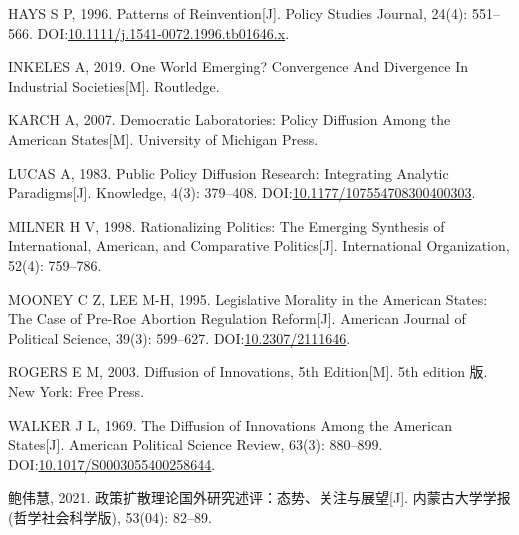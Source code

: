 \documentclass[
  12pt,
]{ctexart}
\newlength{\cslhangindent}
\newlength{\cslentryspacingunit} %
\newenvironment{CSLReferences}[2] %
 {%
  \setlength{\parindent}{0pt}
  \ifodd #1
  \let\oldpar\par
  \def\par{\hangindent=\cslhangindent\oldpar}
  \fi
  \setlength{\parskip}{#2\cslentryspacingunit}
 }%
 {}
\begin{document}
\begin{CSLReferences}{1}{0}
\leavevmode{}%
HAYS S P, 1996. Patterns of {Reinvention}{[}J{]}. Policy Studies Journal, 24(4): 551--566. DOI:\href{https://doi.org/10.1111/j.1541-0072.1996.tb01646.x}{10.1111/j.1541-0072.1996.tb01646.x}.

\leavevmode{}%
INKELES A, 2019. One {World Emerging}? {Convergence And Divergence In Industrial Societies}{[}M{]}. {Routledge}.

\leavevmode{}%
KARCH A, 2007. Democratic {Laboratories}: {Policy Diffusion Among} the {American States}{[}M{]}. {University of Michigan Press}.

\leavevmode{}%
LUCAS A, 1983. Public {Policy Diffusion Research}: {Integrating Analytic Paradigms}{[}J{]}. Knowledge, 4(3): 379--408. DOI:\href{https://doi.org/10.1177/107554708300400303}{10.1177/107554708300400303}.

\leavevmode{}%
MILNER H V, 1998. Rationalizing Politics: {The} Emerging Synthesis of International, {American}, and Comparative Politics{[}J{]}. International Organization, 52(4): 759--786.

\leavevmode{}%
MOONEY C Z, LEE M-H, 1995. Legislative {Morality} in the {American States}: {The Case} of {Pre-Roe Abortion Regulation Reform}{[}J{]}. American Journal of Political Science, 39(3): 599--627. DOI:\href{https://doi.org/10.2307/2111646}{10.2307/2111646}.

\leavevmode{}%
ROGERS E M, 2003. Diffusion of {Innovations}, 5th {Edition}{[}M{]}. 5th edition 版. {New York}: {Free Press}.

\leavevmode{}%
WALKER J L, 1969. The {Diffusion} of {Innovations} Among the {American States}{[}J{]}. American Political Science Review, 63(3): 880--899. DOI:\href{https://doi.org/10.1017/S0003055400258644}{10.1017/S0003055400258644}.

\leavevmode{}%
鲍伟慧, 2021. {政策扩散理论国外研究述评：态势、关注与展望}{[}J{]}. 内蒙古大学学报(哲学社会科学版), 53(04): 82--89.

\end{CSLReferences}
\end{document}
